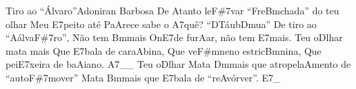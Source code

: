 \begin{musica}{Tiro ao “Álvaro”}{Adoniran Barbosa}{}
De \ac{A}{tan}to le\ac{F#7}{var}
“Fre\ac{Bm}{cha}da” do teu olhar
Meu \ac{E7}{pei}to até
Pa\ac{A}{re}ce sabe o \ac{A7}{quê}?
“\ac{D}{Tá}ub\ac{Dm}{ua}”
De tiro ao “\ac{A}{ál}va\ac{F#7}{ro}”,
Não tem \ac{Bm}{mais}
On\ac{E7}{de} fur\ac{A}{ar}, não tem \ac{E7}{mais}.
Teu o\ac{D}{lhar} mata mais
Que \ac{E7}{ba}la de cara\ac{A}{bi}na,
Que ve\ac{F#m}{ne}no estric\ac{Bm}{ni}na,
Que pei\ac{E7}{xei}ra de ba\ac{A}{ia}no. \ac{A7}{}__
Teu o\ac{D}{lhar}
Mata \ac{Dm}{mais} que atropela\ac{A}{men}to
de “auto\ac{F#7}{mo}ver”
Mata \ac{Bm}{mais} que \ac{E7}{ba}la de “re\ac{A}{vór}ver”. \ac{E7}{}_

\end{musica}
